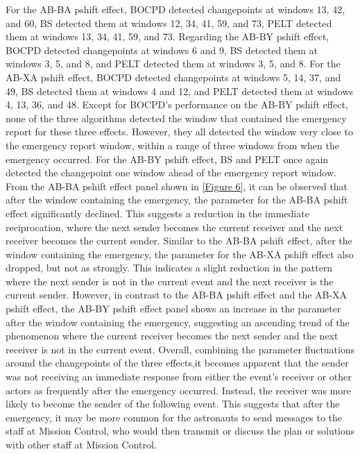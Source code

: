\documentclass[]{interact}
\theoremstyle{plain}%
\theoremstyle{definition}
\theoremstyle{remark}
\begin{document}
{    For the AB-BA pshift effect, BOCPD detected changepoints at windows 13, 42, and 60, BS detected them at windows 12, 34, 41, 59, and 73, PELT detected them at windows 13, 34, 41, 59, and 73. Regarding the AB-BY pshift effect, BOCPD detected changepoints at windows 6 and 9, BS detected them at windows 3, 5, and 8, and PELT detected them at windows 3, 5, and 8. For the AB-XA pshift effect, BOCPD detected changepoints at windows 5, 14, 37, and 49, BS detected them at windows 4 and 12, and PELT detected them at windows 4, 13, 36, and 48. Except for BOCPD's performance on the AB-BY pshift effect, none of the three algorithms detected the window that contained the emergency report for these three effects. However, they all detected the window very close to the emergency report window, within a range of three windows from when the emergency occurred. For the AB-BY pshift effect, BS and PELT once again detected the changepoint one window ahead of the emergency report window. \\
	  
	From the AB-BA pshift effect panel shown in \autoref{Figure 6}, it can be observed that after the window containing the emergency, the parameter for the AB-BA pshift effect significantly declined. This suggests a reduction in the immediate reciprocation, where the next sender becomes the current receiver and the next receiver becomes the current sender. Similar to the AB-BA pshift effect, after the window containing the emergency, the parameter for the AB-XA pshift effect also dropped, but not as strongly. This indicates a slight reduction in the pattern where the next sender is not in the current event and the next receiver is the current sender. However, in contrast to the AB-BA pshift effect and the AB-XA pshift effect, the AB-BY pshift effect panel shows an increase in the parameter after the window containing the emergency, suggesting an ascending trend of the phenomenon where the current receiver becomes the next sender and the next receiver is not in the current event. Overall, combining the parameter fluctuations around the changepoints of the three effects,it becomes apparent that the sender was not receiving an immediate response from either the event's receiver or other actors as frequently after the emergency occurred. Instead, the receiver was more likely to become the sender of the following event. This suggests that after the emergency, it may be more common for the astronauts to send messages to the staff at Mission Control, who would then transmit or discuss the plan or solutions with other staff at Mission Control. \\
	  
}
\end{document}
